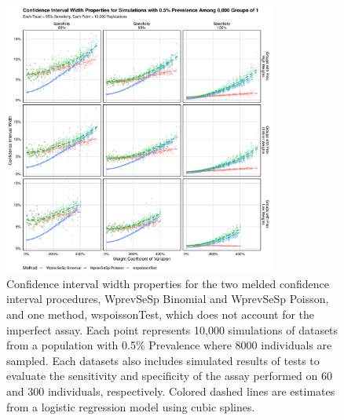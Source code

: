 \documentclass[AMA,STIX1COL]{WileyNJD-v2}
\begin{document}
\begin{figure}
\centering
\includegraphics[width=0.8\textwidth]{figures/imperfect_confidence_interval_width_8000_groups_0_005_prev}
\caption{Confidence interval width properties for the two melded confidence interval procedures, WprevSeSp Binomial and WprevSeSp Poisson, and one method, wspoissonTest, which does not account for the imperfect assay.
Each point represents 10,000 simulations of datasets from a population with 0.5\% Prevalence where 8000 individuals are sampled.
Each datasets also includes simulated results of tests to evaluate the sensitivity and specificity of the assay performed on 60 and 300 individuals, respectively.
Colored dashed lines are estimates from a logistic regression model using cubic splines.}
\label{fig:imperfect_confidence_interval_width_8000_groups_0_005_prev}
\end{figure}
\end{document}
